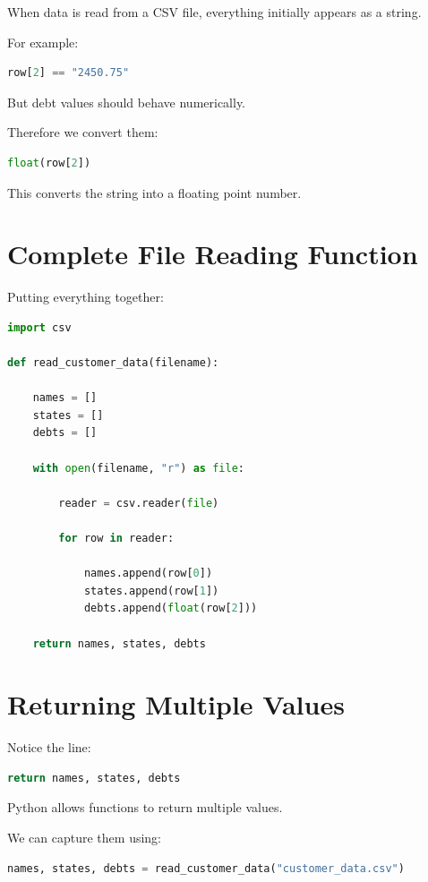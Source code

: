 \documentclass[11pt]{article}
\begin{document}
When data is read from a CSV file, everything initially appears as a string.

For example:

\begin{lstlisting}[language=Python]
row[2] == "2450.75"
\end{lstlisting}

But debt values should behave numerically.

Therefore we convert them:

\begin{lstlisting}[language=Python]
float(row[2])
\end{lstlisting}

This converts the string into a floating point number.

\section{Complete File Reading Function}

Putting everything together:

\begin{lstlisting}[language=Python]
import csv

def read_customer_data(filename):

    names = []
    states = []
    debts = []

    with open(filename, "r") as file:

        reader = csv.reader(file)

        for row in reader:

            names.append(row[0])
            states.append(row[1])
            debts.append(float(row[2]))

    return names, states, debts
\end{lstlisting}

\section{Returning Multiple Values}

Notice the line:

\begin{lstlisting}[language=Python]
return names, states, debts
\end{lstlisting}

Python allows functions to return multiple values.

We can capture them using:

\begin{lstlisting}[language=Python]
names, states, debts = read_customer_data("customer_data.csv")
\end{lstlisting}
\end{document}
